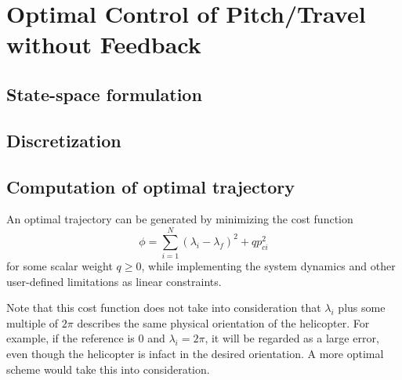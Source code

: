 \section{Optimal Control of Pitch/Travel without Feedback}\label{sec:prob2}

\subsection{State-space formulation}

\subsection{Discretization}

\subsection{Computation of optimal trajectory}

An optimal trajectory can be generated by minimizing the cost function
\begin{equation}
	\phi = \sum_{i=1}^{N}(\lambda_i - \lambda_f)^2 + qp_{ci}^2
\end{equation}
for some scalar weight $q \geq 0$, while implementing the system dynamics and other user-defined limitations as linear constraints.

Note that this cost function does not take into consideration that $\lambda_i$ plus some multiple of $2\pi$ describes the same physical orientation of the helicopter. For example, if the reference is $0$ and $\lambda_i = 2\pi$, it will be regarded as a large error, even though the helicopter is infact in the desired orientation. A more optimal scheme would take this into consideration.
